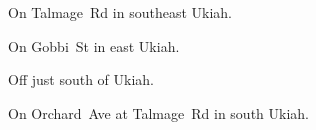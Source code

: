 
\begin{LocationList}

On Talmage~Rd in southeast Ukiah.

\Location{\GasStation \Gas}
On Gobbi~St in east Ukiah.

Off  just south of Ukiah.

On Orchard~Ave at Talmage~Rd in south Ukiah.

\end{LocationList}

